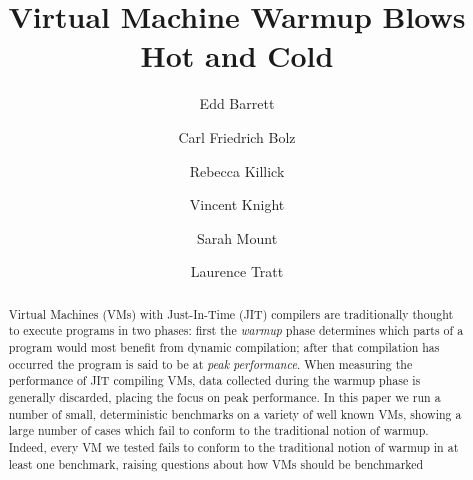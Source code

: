 \documentclass[a4paper,UKenglish]{lipics}
\begin{document}
\title{Virtual Machine Warmup Blows Hot and Cold}
\author[1]{Edd Barrett}
\author[2]{Carl Friedrich Bolz}
\author[3]{Rebecca Killick}
\author[4]{Vincent Knight}
\author[5]{Sarah Mount}
\author[6]{Laurence Tratt}



\maketitle

\begin{abstract}
Virtual Machines (VMs) with Just-In-Time (JIT) compilers are traditionally thought
to execute programs in two phases: first the \emph{warmup} phase determines which
parts of a program would most benefit from dynamic compilation; after that
compilation has occurred the program is said to be at \emph{peak performance}.
When measuring the performance of JIT compiling VMs, data collected
during the warmup phase is generally discarded, placing the focus on peak
performance. In this paper we run a number of small,
deterministic benchmarks on a variety of well known VMs, showing a large number
of cases which fail to conform to the traditional notion of warmup. Indeed,
every VM we tested fails to conform to the traditional notion of warmup in at
least one benchmark, raising questions about how VMs should be benchmarked
\end{abstract}
\end{document}
